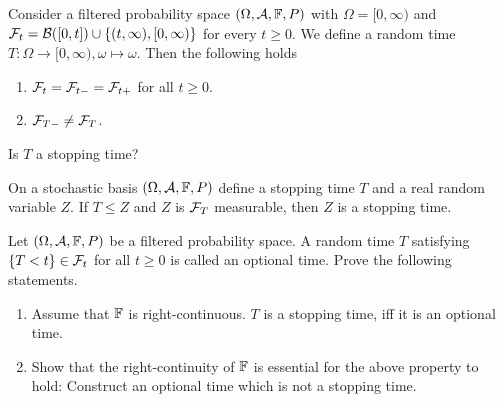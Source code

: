 Consider a filtered probability space $(\Omega, \mathcal A, \mathbb F, P)$ with $\Omega =
[0, \infty)$ and $\mathcal F_t = \mathcal B([0,t]) \cup \left\{ (t,\infty), [0, \infty)
\right\}$ for every $t\geq 0$. We define a random time $T:\Omega\to[0,\infty),
\omega \mapsto \omega$.  Then the following holds
\begin{enumerate}
    \item $\mathcal F_{t} = \mathcal F_{t-} = \mathcal F_{t+}$ for all $t\geq 0$.
    \item $\mathcal F_{T-} \neq \mathcal F_{T}$.
\end{enumerate}
Is $T$ a stopping time?

On a stochastic basis $(\Omega, \mathcal A, \mathbb F, P)$ define a stopping time $T$ and a
real random variable $Z$. If $T \leq Z$ and $Z$ is $\mathcal F_{T}$ measurable, then
$Z$ is a stopping time.

 Let $(\Omega, \mathcal A,
\mathbb F, P)$ be a filtered probability space. A random time $T$ satisfying
$\{T<t\}\in\mathcal F_{t}$ for all $t\geq 0$ is called an optional time. Prove the
following statements.
\begin{enumerate}
    \item Assume that $\mathbb F$ is right-continuous. $T$ is a stopping time, iff it
        is an optional time.
    \item Show that the right-continuity of $\mathbb F$ is essential for the above
        property to hold: Construct an optional time which is not a stopping
        time.
\end{enumerate}

